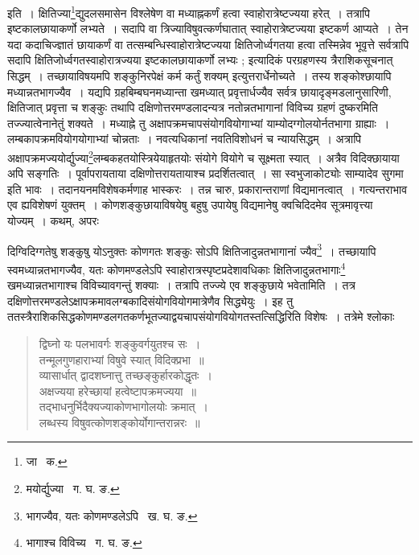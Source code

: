 \documentclass[11pt, openany]{book}
\begin{document}
\noindent इति~। क्षितिज्या\renewcommand{\thefootnote}{२}\footnote{जा \textendash\ क.}द्युदलसमासेन विश्लेषेण वा मध्याह्नकर्णं हत्वा स्वाहोरात्रेष्टज्यया हरेत्~। तत्रापि इष्टकालछायाकर्णो लभ्यते~। सदापि वा त्रिज्याविषुवत्कर्णघातात् स्वाहोरात्रेष्टज्यया इष्टकर्ण आप्यते~। तेन यदा कदाचिज्ज्ञातं छायाकर्णं वा तत्सम्बन्धिस्वाहोरात्रेष्टज्यया क्षितिजोर्ध्वगतया हत्वा तस्मिन्नेव भूवृत्ते सर्वत्रापि सदापि क्षितिजोर्ध्वगतस्वाहोरात्रज्यया इष्टकालछायाकर्णो लभ्यः ; इत्यादिकं परग्रहणस्य त्रैराशिकसूचनात् सिद्धम्~। तच्छायाविषयमपि शङ्कुनिरपेक्षं कर्म कर्तुं शक्यम् इत्युत्तरार्धेनोच्यते~। तस्य शङ्कोश्छायापि मध्यान्नतभागज्यैव~। यद्यपि ग्रहबिम्बघनमध्यान्ता खमध्यात् प्रवृत्तार्धज्यैव सर्वत्र छायादृङ्मडलानुसारिणी, क्षितिजात् प्रवृत्ता च शङ्कुः तथापि दक्षिणोत्तरमण्डलादन्यत्र नतोन्नतभागानां विविच्य ग्रहणं दुष्करमिति तज्ज्यात्वेनानेतुं शक्यते~। मध्याह्ने तु अक्षापक्रमचापसंयोगवियोगाभ्यां याम्योदग्गोलयोर्नतभागा ग्राह्याः~। लम्बकापक्रमवियोगयोगाभ्यां चोन्नताः~। नवत्यधिकानां नवतिविशोधनं च न्यायसिद्धम्~। अत्रापि अक्षापक्रमज्ययोर्द्युज्या\renewcommand{\thefootnote}{३}\footnote{मयोर्द्युज्या \textendash\ ग. घ. ङ.}लम्बकहतयोस्त्रियेयाहृतयोः संयोगे वियोगे च सूक्ष्मता स्यात्~। अत्रैव विदिक्छायाया अपि सङ्गतिः~। पूर्वापरायताया दक्षिणोत्तरायतायाश्च प्रदर्शितत्वात्~। सा स्वभुजाकोट्योः साम्यादेव सुगमा इति भावः~। तदानयनमविशेषकर्मणाह भास्करः~। तन्न चारु, प्रकारान्तराणां विद्यमानत्वात्~। गत्यन्तराभाव एव ह्यविशेषणं युक्तम्~। कोणशङ्कुछायाविषयेषु बहुषु उपायेषु विद्यमानेषु क्वचिदिदमेव सूत्रमावृत्त्या योज्यम्~। कथम्, अपरः 

\newpage

\noindent दिग्विदिग्गतेषु शङ्कुषु योऽनुक्तः कोणगतः शङ्कुः सोऽपि क्षितिजादुन्नतभागानां ज्यैव\renewcommand{\thefootnote}{१}\footnote{भागज्यैव, यतः कोणमण्डलेऽपि \textendash\ ख. घ. ङ.}~। तच्छायापि स्वमध्यान्नतभागज्यैव, यतः कोणमण्डलेऽपि स्वाहोरात्रस्पृष्टप्रदेशावधिकाः क्षितिजादुन्नतभागाः\renewcommand{\thefootnote}{२}\footnote{भागाश्च विविच्य \textendash\ ग. घ. ङ.}
खमध्यान्नतभागाश्च विविच्यावगन्तुं शक्याः~। तत्रापि तज्ज्ये एव शङ्कुछाये भवेतामिति~। तत्र 
दक्षिणोत्तरमण्डलेऽक्षापक्रमावलग्बकादिसंयोगवियोगमात्रेणैव सिद्ध्येयुः~। इह तु 
ततस्त्रैराशिकसिद्धकोणमण्डलगतकर्णभूतज्याद्वयचापसंयोगवियोगतस्तत्सिद्धिरिति विशेषः~। तत्रेमे श्लोकाः\textendash 
 
\begin{quote}
{\qt द्विघ्नो यः पलभावर्गः शङ्कुवर्गयुतश्च सः~। \\
 तन्मूलगुणहाराभ्यां विषुवे स्यात् विदिक्प्रभा~॥ \\
 व्यासार्धात् द्वादशघ्नात्तु तच्छङ्कुर्हारकोद्धृतः~। \\
 अक्षज्यया हरेच्छायां हत्वेष्टापक्रमज्यया~॥ \\
 तद्भाधनुर्भिदैक्यज्याकोणभागोलयोः क्रमात्~। \\
 लब्धस्य विषुवत्कोणशङ्कोर्योगान्तरान्नरः~॥}
\end{quote}
\end{document}
